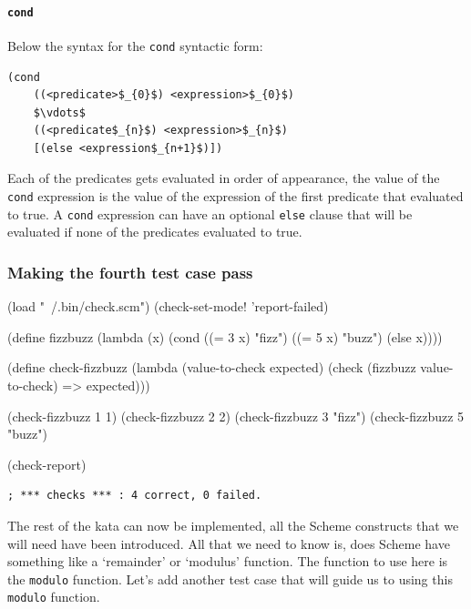 \documentclass[12pt,a4paper,english,twoside]{article}
\begin{document}
\paragraph{\texttt{cond}}
Below the syntax for the \texttt{cond} syntactic form:
\begin{lstlisting}[mathescape]
  (cond 
    ((<predicate>$_{0}$) <expression>$_{0}$)
    $\vdots$ 
    ((<predicate$_{n}$) <expression>$_{n}$)
    [(else <expression$_{n+1}$)])
\end{lstlisting}
Each of the predicates gets evaluated in order of appearance, the value of the 
\texttt{cond} expression is the value of the expression of the first predicate 
that evaluated to true. A \texttt{cond} expression can have an optional 
\texttt{else} clause that will be evaluated if none of the predicates 
evaluated to true.
\subsubsection{Making the fourth test case pass}
\begin{schemecode}
(load "~/.bin/check.scm")
(check-set-mode! 'report-failed)

(define fizzbuzz 
  (lambda (x) 
    (cond ((= 3 x) "fizz")
          ((= 5 x) "buzz")
          (else x))))

(define check-fizzbuzz 
  (lambda (value-to-check expected)
    (check (fizzbuzz value-to-check) => expected)))

(check-fizzbuzz 1 1)
(check-fizzbuzz 2 2)
(check-fizzbuzz 3 "fizz")
(check-fizzbuzz 5 "buzz")

(check-report)
\end{schemecode}
\begin{lstlisting}
; *** checks *** : 4 correct, 0 failed.  
\end{lstlisting}
The rest of the kata can now be implemented, all the Scheme constructs that we 
will need have been introduced. All that we need to know is, does Scheme have 
something like a `remainder' or `modulus' function. The function to use here 
is the \texttt{modulo} function. Let's add another test case that will guide 
us to using this \texttt{modulo} function.
\end{document}
